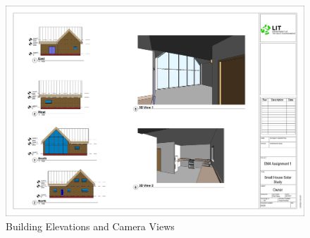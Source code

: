 \begin{figure}
	\centering
	\includegraphics[width=1.0\linewidth]{"RevitFiles/Assignment1 - Sheet - A101 - Small House Solar Study"}
	\caption{Building Elevations and Camera Views}
	\label{fig:a101}
\end{figure}



